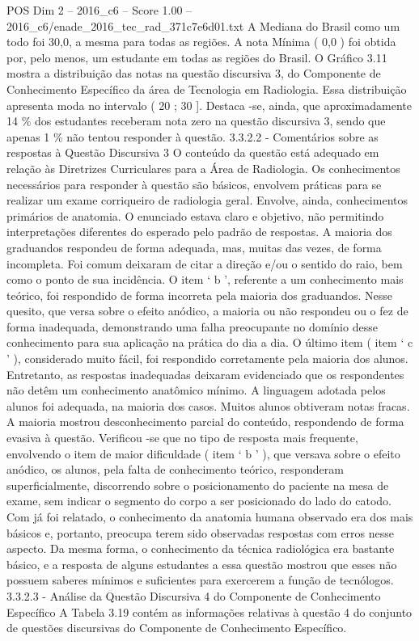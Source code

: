 \begin{textsample}{POS Dim 2 – 2016\_c6 – Score 1.00 – 2016\_c6/enade\_2016\_tec\_rad\_371c7e6d01.txt}
A Mediana do Brasil como um todo foi 30,0, a mesma para todas as regiões.
A nota Mínima ( 0,0 ) foi obtida por, pelo menos, um estudante em todas as regiões do Brasil.
O Gráfico 3.11 mostra a distribuição das notas na questão discursiva 3, do Componente de Conhecimento Específico da área de Tecnologia em Radiologia.
Essa distribuição apresenta moda no intervalo ( 20 ; 30 ].
Destaca -se, ainda, que aproximadamente 14 \% dos estudantes receberam nota zero na questão discursiva 3, sendo que apenas 1 \% não tentou responder à questão. 3.3.2.2 - Comentários sobre as respostas à Questão Discursiva 3 O conteúdo da questão está adequado em relação às Diretrizes Curriculares para a Área de Radiologia.
Os conhecimentos necessários para responder à questão são básicos, envolvem práticas para se realizar um exame corriqueiro de radiologia geral.
Envolve, ainda, conhecimentos primários de anatomia.
O enunciado estava claro e objetivo, não permitindo interpretações diferentes do esperado pelo padrão de respostas.
A maioria dos graduandos respondeu de forma adequada, mas, muitas das vezes, de forma incompleta.
Foi comum deixaram de citar a direção e/ou o sentido do raio, bem como o ponto de sua incidência.
O item ‘ b ’, referente a um conhecimento mais teórico, foi respondido de forma incorreta pela maioria dos graduandos.
Nesse quesito, que versa sobre o efeito anódico, a maioria ou não respondeu ou o fez de forma inadequada, demonstrando uma falha preocupante no domínio desse conhecimento para sua aplicação na prática do dia a dia.
O último item ( item ‘ c ’ ), considerado muito fácil, foi respondido corretamente pela maioria dos alunos.
Entretanto, as respostas inadequadas deixaram evidenciado que os respondentes não detêm um conhecimento anatômico mínimo.
A linguagem adotada pelos alunos foi adequada, na maioria dos casos.
Muitos alunos obtiveram notas fracas.
A maioria mostrou desconhecimento parcial do conteúdo, respondendo de forma evasiva à questão.
Verificou -se que no tipo de resposta mais frequente, envolvendo o item de maior dificuldade ( item ‘ b ’ ), que versava sobre o efeito anódico, os alunos, pela falta de conhecimento teórico, responderam superficialmente, discorrendo sobre o posicionamento do paciente na mesa de exame, sem indicar o segmento do corpo a ser posicionado do lado do catodo.
Com já foi relatado, o conhecimento da anatomia humana observado era dos mais básicos e, portanto, preocupa terem sido observadas respostas com erros nesse aspecto.
Da mesma forma, o conhecimento da técnica radiológica era bastante básico, e a resposta de alguns estudantes a essa questão mostrou que esses não possuem saberes mínimos e suficientes para exercerem a função de tecnólogos. 3.3.2.3 - Análise da Questão Discursiva 4 do Componente de Conhecimento Específico A Tabela 3.19 contém as informações relativas à questão 4 do conjunto de questões discursivas do Componente de Conhecimento Específico.

\end{textsample}
